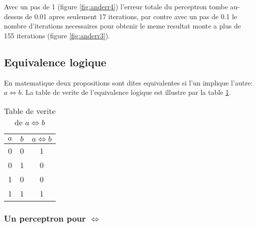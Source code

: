 \documentclass[twoside,openright,a4paper,11pt,french]{article}
\begin{document}
Avec un pas de 1 (figure \ref{fig:anderr4}) l'erreur totale du perceptron
tombe au-dessus de 0.01 apres seulement 17 iterations, par contre avec 
un pas de 0.1 le nombre d'iterations necessaires pour obtenir le meme
resultat monte a plus de 155 iterations (figure \ref{fig:anderr3}).

\subsection{Equivalence logique}
En matematique deux propositions sont dites equivalentes si l'un implique
l'autre: $a \Leftrightarrow b$. La table de verite de l'equivalence logique
est illustre par la table \ref{tab:eq}.


\begin{table}[h]
  \centering
  \begin{tabular}{| c | c | c |}
    \hline
    \textbf{$a$} & \textbf{$b$} & \textbf{$a \Leftrightarrow b$}\\
    \hline
    0 & 0  & 1 \\
    \hline
    0 & 1  & 0 \\
    \hline
    1 & 0  & 0 \\
    \hline
    1 & 1  & 1 \\
    \hline
  \end{tabular}
  \caption{Table de verite de $a \Leftrightarrow b$}
  \label{tab:eq}
\end{table}

\subsubsection{Un perceptron pour $\Leftrightarrow$}

\iffalse
1) En suivant l'exemple precedent proposer un perceptron mono couche pour
   l'equivalence logique 
    - Montrer la courbe d'apprentissage:
    - Expliquer pourquoi la courbe d'apprentissage ne converge pas
        --> Parceque l'eq. n'est pas linearement separable
    - Montrer que avec un pas d'apprentissage different le resultat
      ne change pas (essayer avec 0.1 et 1)
2) Proposer un perceptron multi-couches
    - Montrer que l'apprentissage converge
3) Montrer les resultats en changeant:
    - pas d'apprentissage
    - fonction d'activation
    - nombre de neurones
    - nombre de couches 
    ==> faire beaucoup de screenshots de Neuroph :)
        (ex. resultats des test, interface 
NB:
  - pas besoin de screenshot pour la courbe d'apprentissage
    on peut la sauvgarder directement
  - pour convertir un image au format eps (pour latex) il suffit
    simplement `convert image.truc image.eps` sur bash
  - si il y a besoin de generer des images avec gnuplot 
    je peut me n'occuper
\fi





\end{document}
